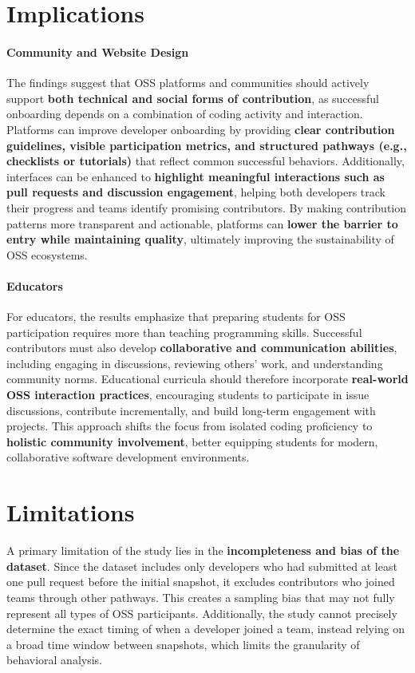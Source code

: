 \section{Implications}
\paragraph{Community and Website Design} The findings suggest that OSS platforms and communities should actively support \textbf{both technical and social forms of contribution}, as successful onboarding depends on a combination of coding activity and interaction. Platforms can improve developer onboarding by providing \textbf{clear contribution guidelines, visible participation metrics, and structured pathways (e.g., checklists or tutorials)} that reflect common successful behaviors. Additionally, interfaces can be enhanced to \textbf{highlight meaningful interactions such as pull requests and discussion engagement}, helping both developers track their progress and teams identify promising contributors. By making contribution patterns more transparent and actionable, platforms can \textbf{lower the barrier to entry while maintaining quality}, ultimately improving the sustainability of OSS ecosystems.

\paragraph{Educators} For educators, the results emphasize that preparing students for OSS participation requires more than teaching programming skills. Successful contributors must also develop \textbf{collaborative and communication abilities}, including engaging in discussions, reviewing others’ work, and understanding community norms. Educational curricula should therefore incorporate \textbf{real-world OSS interaction practices}, encouraging students to participate in issue discussions, contribute incrementally, and build long-term engagement with projects. This approach shifts the focus from isolated coding proficiency to \textbf{holistic community involvement}, better equipping students for modern, collaborative software development environments.

\section{Limitations}
A primary limitation of the study lies in the \textbf{incompleteness and bias of the dataset}. Since the dataset includes only developers who had submitted at least one pull request before the initial snapshot, it excludes contributors who joined teams through other pathways. This creates a sampling bias that may not fully represent all types of OSS participants. Additionally, the study cannot precisely determine the exact timing of when a developer joined a team, instead relying on a broad time window between snapshots, which limits the granularity of behavioral analysis.

